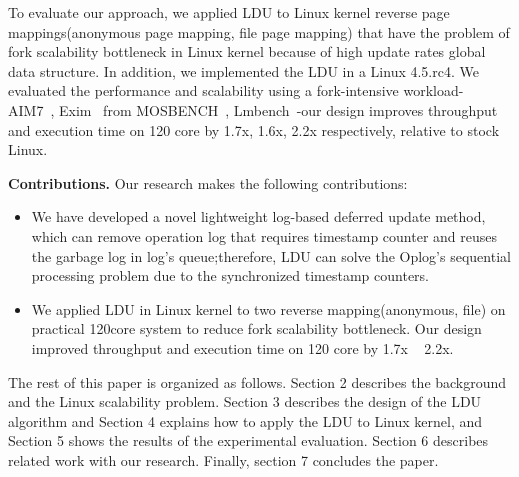 To evaluate our approach, we applied LDU to Linux kernel reverse
page mappings(anonymous page mapping, file page mapping) that have the
problem of fork scalability bottleneck in Linux kernel because of
high update rates global data structure.
In addition, we implemented the LDU in a Linux 4.5.rc4.
We evaluated the performance and scalability using a fork-intensive workload-
AIM7~\cite{AIM7Benchmark}, Exim~\cite{Exim} from MOSBENCH~\cite{MOSBENCH},
Lmbench~\cite{mcvoy1996lmbench}-our design improves throughput and execution
time on 120 core by 1.7x, 1.6x, 2.2x respectively, relative to stock Linux.


\textbf{Contributions.} Our research makes the following contributions:
\begin{itemize}
\item We have developed a novel lightweight log-based deferred update method,
which can remove operation log that requires timestamp counter and reuses
the garbage log in log's queue;therefore, LDU can solve the Oplog's sequential processing problem due to the synchronized timestamp counters.
\item 
We applied LDU in Linux kernel to two reverse mapping(anonymous, file) on
practical 120core system to reduce fork scalability bottleneck.
Our design improved throughput and execution time on 120 core by 1.7x ~ 2.2x.
\end{itemize}


The rest of this paper is organized as follows.
Section 2 describes the background and the Linux scalability problem.
Section 3 describes the design of the LDU algorithm and 
Section 4 explains how to apply the LDU to Linux kernel, and
Section 5 shows the results of the experimental evaluation. 
Section 6 describes related work with our research.
Finally, section 7 concludes the paper.

